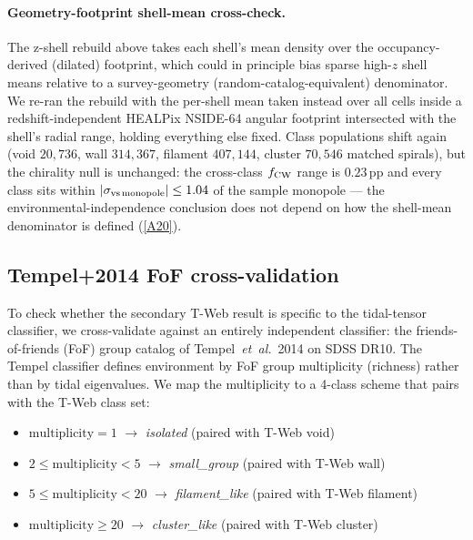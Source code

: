 \documentclass[aps,prd,twocolumn,superscriptaddress,showpacs,preprintnumbers,nofootinbib,longbibliography,floatfix]{revtex4-2}
\newcommand{\repoBase}{https://github.com/Hubify-Projects/bigbounce/blob/main}
\begin{document}
\paragraph{Geometry-footprint shell-mean cross-check.} The z-shell
rebuild above takes each shell's mean density over the
occupancy-derived (dilated) footprint, which could in principle bias
sparse high-$z$ shell means relative to a survey-geometry
(random-catalog-equivalent) denominator. We re-ran the rebuild with
the per-shell mean taken instead over all cells inside a
redshift-independent HEALPix NSIDE-64 angular footprint intersected
with the shell's radial range, holding everything else fixed. Class
populations shift again (void $20{,}736$, wall $314{,}367$, filament
$407{,}144$, cluster $70{,}546$ matched spirals), but the chirality
null is unchanged: the cross-class $f_{\rm CW}$ range is
$0.23$\,pp and every class sits within $|\sigma_{\rm vs\,monopole}|
\le 1.04$ of the sample monopole — the environmental-independence
conclusion does not depend on how the shell-mean denominator is
defined
(\href{\repoBase/pipelines/p5\_desi\_chirality/outputs/19\_v0151\_zshell\_geofootprint\_check.json}{[A20]}).

\subsection{Tempel+2014 FoF cross-validation}\label{sec:tempel}

To check whether the secondary T-Web result is specific to the
tidal-tensor classifier, we cross-validate against an entirely
independent classifier: the friends-of-friends (FoF) group catalog of
Tempel~\textit{et~al.}~2014 \cite{Tempel2014} on SDSS DR10. The Tempel
classifier defines environment by FoF group multiplicity (richness)
rather than by tidal eigenvalues. We map the multiplicity to a 4-class
scheme that pairs with the T-Web class set:

\begin{itemize}
\item $\mathrm{multiplicity}\!=\!1$ $\to$ \emph{isolated} (paired with T-Web void)
\item $2 \le \mathrm{multiplicity} < 5$ $\to$ \emph{small\_group} (paired with T-Web wall)
\item $5 \le \mathrm{multiplicity} < 20$ $\to$ \emph{filament\_like} (paired with T-Web filament)
\item $\mathrm{multiplicity} \ge 20$ $\to$ \emph{cluster\_like} (paired with T-Web cluster)
\end{itemize}
\end{document}
